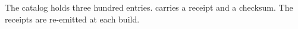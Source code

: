 The catalog holds three hundred entries.
carries a receipt and a checksum.
The receipts are re-emitted at each build.
